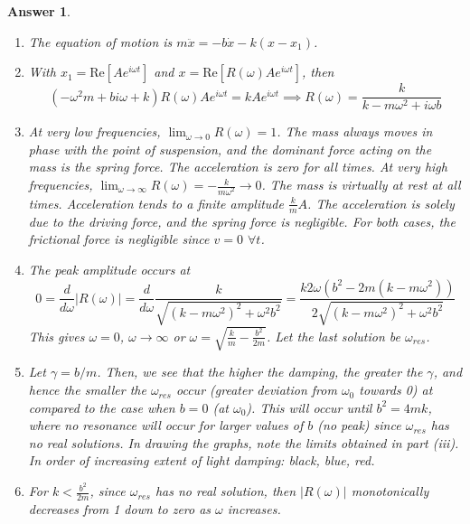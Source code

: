 \documentclass[a4paper]{article}
\newtheorem{ans}{Answer}[subsection]
\theoremstyle{new}
\begin{document}
\newpage
\begin{ans}\leavevmode
\begin{enumerate}[label=(\roman*)]
\item The equation of motion is $m\ddot{x}=-b\dot{x}-k(x-x_1)$.
\item With $x_1=\text{Re}[Ae^{i\omega t}]$ and $x=\text{Re}[R(\omega)Ae^{i\omega t}]$, then
$$(-\omega^2m+bi\omega +k)R(\omega)Ae^{i\omega t}=kAe^{i\omega t}\implies R(\omega)=\frac{k}{k-m\omega^2+i\omega b}$$
\item At very low frequencies, $\lim_{\omega\rightarrow0}R(\omega)=1$. The mass always moves in phase with the point of suspension, and the dominant force acting on the mass is the spring force. The acceleration is zero for all times. At very high frequencies, $\lim_{\omega\rightarrow\infty}R(\omega)=-\frac{k}{m\omega^2}\rightarrow 0$. The mass is virtually at rest at all times. Acceleration tends to a finite amplitude $\frac{k}{m}A$. The acceleration is solely due to the driving force, and the spring force is negligible. For both cases, the frictional force is negligible since $v=0$ $\forall t$.
\item The peak amplitude occurs at
$$0=\frac{d}{d\omega}|R(\omega)|=\frac{d}{d\omega}\frac{k}{\sqrt{(k-m\omega^2)^2+\omega^2b^2}}=\frac{k2\omega(b^2-2m(k-m\omega^2))}{2\sqrt{(k-m\omega^2)^2+\omega^2b^2}}$$
This gives $\omega=0$, $\omega\rightarrow\infty$ or $\omega=\sqrt{\frac{k}{m}-\frac{b^2}{2m}}$. Let the last solution be $\omega_{res}$.
\item Let $\gamma=b/m$. Then, we see that the higher the damping, the greater the $\gamma$, and hence the smaller the $\omega_{res}$ occur (greater deviation from $\omega_0$ towards 0) at compared to the case when $b=0$ (at $\omega_0$). This will occur until $b^2=4mk$, where no resonance will occur for larger values of $b$ (no peak) since $\omega_{res}$ has no real solutions. In drawing the graphs, note the limits obtained in part (iii). In order of increasing extent of light damping: black, blue, red.
\begin{center}
\end{center}
\item For $k<\frac{b^2}{2m}$, since $\omega_{res}$ has no real solution, then $|R(\omega)|$ monotonically decreases from 1 down to zero as $\omega$ increases.
\end{enumerate}
\end{ans}
\end{document}
